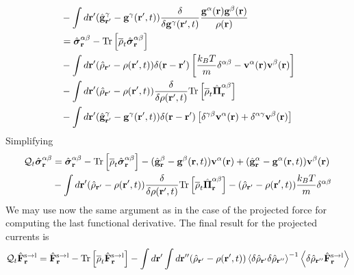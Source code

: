 \documentclass[b5paper,openright,11pt]{book}
\newcommand{\llangle}{\left\langle}
\newcommand{\rrangle}{\right\rangle}
\begin{document}
\begin{appendices}
\begin{align}
&-\int d{\bf r}'(\hat{\bf g}^\gamma_{{\bf r}'}-{\bf g}^\gamma({\bf r}',t))
\frac{\delta}{\delta {\bf g}^\gamma({\bf r}',t)}
\frac{{\bf g}^\alpha({\bf r}){\bf g}^\beta({\bf r})}{\rho({\bf r})}
\nonumber\\
&=
\hat{\boldsymbol{\sigma}}^{\alpha\beta}_{{\bf r}}-{\rm Tr}\left[\overline{\rho}_t\hat{\boldsymbol{\sigma}}^{\alpha\beta}_{{\bf r}}\right]
\nonumber\\
&-\int d{\bf r}'(\hat{\rho}_{{\bf r}'}-\rho({\bf r}',t))
\delta({\bf r}-{\bf r}') \left[\frac{k_BT}{m}\delta^{\alpha\beta}-{\bf v}^\alpha({\bf r}){\bf v}^\beta({\bf r})\right]
\nonumber\\
&-\int d{\bf r}'(\hat{\rho}_{{\bf r}'}-\rho({\bf r}',t))
\frac{\delta}{\delta \rho({\bf r}',t)}
{\rm Tr}\left[\overline{\rho}_{t} \hat{\boldsymbol{\Pi}}^{\alpha\beta}_{{\bf r}}\right]
\nonumber\\
&-\int d{\bf r}'(\hat{\bf g}^\gamma_{{\bf r}'}-{\bf g}^\gamma({\bf r}',t))\delta({\bf r}-{\bf r}')
\left[\delta^{\gamma\beta}{\bf v}^\alpha({\bf r})+\delta^{\alpha\gamma}{\bf v}^\beta({\bf r})\right]
\label{QS2}
\end{align}
Simplifying
\begin{align}
  {\cal Q}_t\hat{\boldsymbol{\sigma}}^{\alpha\beta}_{{\bf r}}&=
\hat{\boldsymbol{\sigma}}^{\alpha\beta}_{{\bf r}}-{\rm Tr}\left[\overline{\rho}_t\hat{\boldsymbol{\sigma}}^{\alpha\beta}_{{\bf r}}\right]
-(\hat{\bf g}^\beta_{{\bf r}}-{\bf g}^\beta({\bf r},t))
{\bf v}^\alpha({\bf r})+
(\hat{\bf g}^\alpha_{{\bf r}}-{\bf g}^\alpha({\bf r},t))
{\bf v}^\beta({\bf r})
\nonumber\\
&-\int d{\bf r}'(\hat{\rho}_{{\bf r}'}-\rho({\bf r}',t))
\frac{\delta}{\delta \rho({\bf r}',t)}
{\rm Tr}\left[\overline{\rho}_{t} \hat{\boldsymbol{\Pi}}^{\alpha\beta}_{{\bf r}}\right]
-(\hat{\rho}_{{\bf r}'}-\rho({\bf r}',t))\frac{k_BT}{m}\delta^{\alpha\beta}
\label{QS3}
\end{align}
We may use now the same argument as in the case of the projected force
for computing the last functional derivative. The final result for the
projected currents is
\begin{align}
    {\cal Q}_t\hat{\bf F}^{\rm s\to l}_{{\bf r}}&=
\hat{\bf F}^{\rm s\to l}_{{\bf r}}- {\rm Tr}\left[\overline{\rho}_{t} \hat{\bf F}^{\rm s\to l}_{{\bf r}}\right]
-\int d{\bf r}'\int d{\bf r}''(\hat{\rho}_{{\bf r}'}-{\rho}({\bf r}',t))
\llangle \delta\hat{\rho}_{{\bf r}'}\delta\hat{\rho}_{{\bf r}''}\rrangle^{-1}
\llangle \delta \hat{\rho}_{{\bf r}''}\hat{\bf F}^{\rm s\to l}_{{\bf r}}\rrangle
\nonumber\\

\end{align}
\end{appendices}
\end{document}
